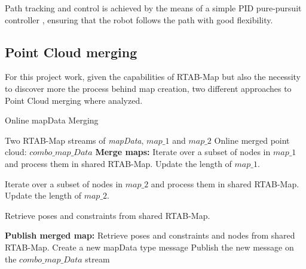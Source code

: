 Path tracking and control is achieved by the means of a simple PID pure-pursuit controller \cite{pure_pursuit}, ensuring that the robot follows the path with good flexibility.



\subsection{Point Cloud merging}
\label{sec:point_cl}
For this project work, given the capabilities of RTAB-Map but also the necessity to discover more the process behind map creation, two different approaches to Point Cloud merging where analyzed. 

\begin{algorithm}[b]
\caption{Online mapData Merging} \label{algmapData}
\begin{algorithmic}[1]
\REQUIRE Two RTAB-Map streams of \textit{mapData}, $map\_1$ and $map\_2$ 
\ENSURE Online merged point cloud: $combo\_map\_Data$
        \STATE \textbf{Merge maps:}
        \STATE \hspace{0.3cm} Iterate over a subset of nodes in $map\_1$ and process them in shared RTAB-Map.
        \STATE \hspace{0.3cm} Update the length of $map\_1$.

        \STATE \hspace{0.3cm} Iterate over a subset of nodes in $map\_2$ and process them in shared RTAB-Map.
        \STATE \hspace{0.3cm} Update the length of $map\_2$.

        \STATE \hspace{0.3cm} Retrieve poses and constraints from  shared RTAB-Map.
    
        \STATE \textbf{Publish merged map:}
        \STATE \hspace{0.3cm} Retrieve poses and constraints and nodes from shared RTAB-Map.
        \STATE \hspace{0.3cm} Create a new mapData type message
        \STATE \hspace{0.3cm} Publish the new message on the $combo\_map\_Data$ stream
    
    \ENDIF
\end{algorithmic}
\end{algorithm}

